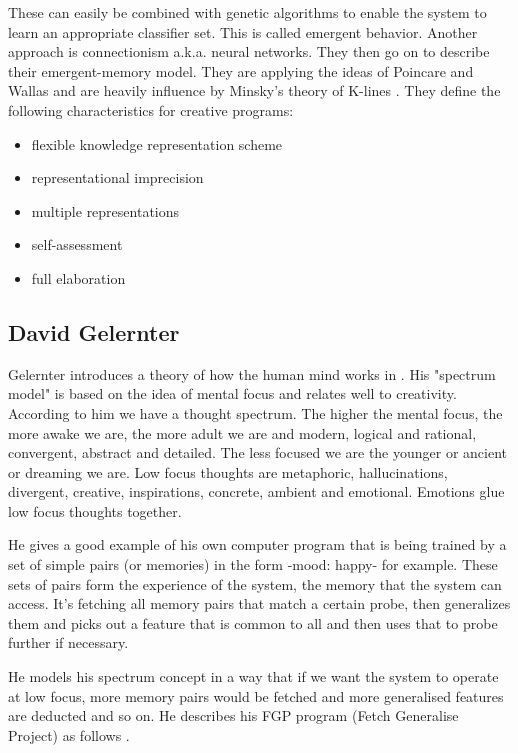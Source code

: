 These can easily be combined with genetic algorithms to enable the system to learn an appropriate classifier set. This is called emergent behavior. Another approach is connectionism a.k.a. neural networks. They then go on to describe their emergent-memory model. They are applying the ideas of Poincare and Wallas and are heavily influence by Minsky's theory of K-lines \citep{Minsky1980, Minsky1988}. They define the following characteristics for creative programs:

\begin{itemize}
  \item flexible knowledge representation scheme
  \item representational imprecision
  \item multiple representations
  \item self-assessment
  \item full elaboration
\end{itemize}

\subsection{David Gelernter}

Gelernter introduces a theory of how the human mind works in \citep{Gelernter1994}. His "spectrum model" is based on the idea of mental focus and relates well to creativity. According to him we have a thought spectrum. The higher the mental focus, the more awake we are, the more adult we are and modern, logical and rational, convergent, abstract and detailed. The less focused we are the younger or ancient or dreaming we are. Low focus thoughts are metaphoric, hallucinations, divergent, creative, inspirations, concrete, ambient and emotional. Emotions glue low focus thoughts together.

He gives a good example of his own computer program that is being trained by a set of simple pairs (or memories) in the form -mood: happy- for example. These sets of pairs form the experience of the system, the memory that the system can access. It's fetching all memory pairs that match a certain probe, then generalizes them and picks out a feature that is common to all and then uses that to probe further if necessary.

He models his spectrum concept in a way that if we want the system to operate at low focus, more memory pairs would be fetched and more generalised features are deducted and so on. He describes his FGP program (Fetch Generalise Project) as follows \citep[p.132]{Gelernter1994}.

